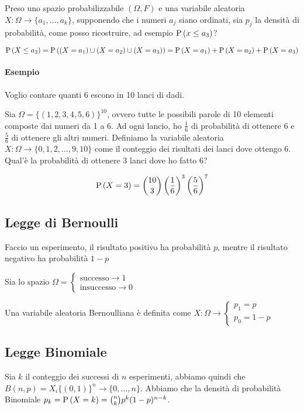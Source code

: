 Preso uno spazio probabilizzabile $ (\Omega, F) $ e una variabile aleatoria $ X : \Omega \to \{ a_1, \dots, a_k \} $, supponendo che i numeri $ a_j $ siano ordinati, sia $ p_j $ la densità di probabilità, come posso ricostruire, ad esempio $ \text{P}\left(x \leq a_3\right) $?

\[ \text{P}\left(X \leq a_3\right) = \text{P}\left((X=a_1) \cup (X=a_2) \cup (X=a_3)\right) = \text{P}\left(X = a_1\right) + \text{P}\left(X = a_2\right) + \text{P}\left(X = a_3\right)  \]

\paragraph{Esempio}

Voglio contare quanti 6 escono in 10 lanci di dadi.

Sia $ \Omega = \{ (1, 2, 3, 4, 5, 6)\}^{10} $, ovvero tutte le possibili parole di 10 elementi composte dai numeri da 1 a 6. Ad ogni lancio, ho $ \frac{1}{6} $ di probabilità di ottenere 6 e $ \frac{5}{6} $ di ottenere gli altri numeri. Definiamo la variabile aleatoria $ X : \Omega \to \{ 0, 1, 2, \dots, 9, 10 \} $ come il conteggio dei risultati dei lanci dove ottengo 6. Qual'è la probabilità di ottenere 3 lanci dove ho fatto 6?

\[ \text{P}\left(X = 3\right) = \binom{10}{3} \left(\dfrac{1}{6}\right)^3 \left(\dfrac{5}{6}\right)^7 \]

\subsection{Legge di Bernoulli}
Faccio un esperimento, il risultato positivo ha probabilità $ p $, mentre il risultato negativo ha probabilità $ 1 - p $

Sia lo spazio $ \Omega = \begin{cases}
\text{successo} \to 1 \\
\text{insuccesso} \to 0
\end{cases} $

Una variabile aleatoria Bernoulliana è definita come $ X : \Omega \to \begin{cases}
p_1 = p \\ p_0 = 1 - p
\end{cases} $

\subsection{Legge Binomiale} 
Sia $ k $ il conteggio dei successi di $ n $ esperimenti, abbiamo quindi che $ B(n,p) = X_i\{(0,1)\}^n \to \{0, \dots, n\} $. Abbiamo che la densità di probabilità Binomiale $ p_k = \text{P}\left(X=k\right) = \binom{n}{k} p^k(1-p)^{n-k} $.

